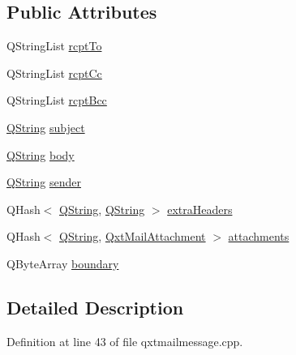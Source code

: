 \subsection*{Public Attributes}
\begin{DoxyCompactItemize}
\item 
Q\-String\-List \hyperlink{struct_qxt_mail_message_private_a2c213268a40ead0fff52429eab1f202f}{rcpt\-To}
\item 
Q\-String\-List \hyperlink{struct_qxt_mail_message_private_a2f20a66e59447730c829c613aad9cdf7}{rcpt\-Cc}
\item 
Q\-String\-List \hyperlink{struct_qxt_mail_message_private_ae0915964b3ff04c0e519d1296676f859}{rcpt\-Bcc}
\item 
\hyperlink{group___u_a_v_objects_plugin_gab9d252f49c333c94a72f97ce3105a32d}{Q\-String} \hyperlink{struct_qxt_mail_message_private_a0f9808e182950b8c18d1d26538fe8658}{subject}
\item 
\hyperlink{group___u_a_v_objects_plugin_gab9d252f49c333c94a72f97ce3105a32d}{Q\-String} \hyperlink{struct_qxt_mail_message_private_aa44931c7c2e5e0873a3c6c5ddd6bf530}{body}
\item 
\hyperlink{group___u_a_v_objects_plugin_gab9d252f49c333c94a72f97ce3105a32d}{Q\-String} \hyperlink{struct_qxt_mail_message_private_ac9edcfbd983f75f565ff1a9b1a4fac32}{sender}
\item 
Q\-Hash$<$ \hyperlink{group___u_a_v_objects_plugin_gab9d252f49c333c94a72f97ce3105a32d}{Q\-String}, \hyperlink{group___u_a_v_objects_plugin_gab9d252f49c333c94a72f97ce3105a32d}{Q\-String} $>$ \hyperlink{struct_qxt_mail_message_private_aea674d61ebec8764d6d8ec62fbdb23f2}{extra\-Headers}
\item 
Q\-Hash$<$ \hyperlink{group___u_a_v_objects_plugin_gab9d252f49c333c94a72f97ce3105a32d}{Q\-String}, \hyperlink{class_qxt_mail_attachment}{Qxt\-Mail\-Attachment} $>$ \hyperlink{struct_qxt_mail_message_private_adb94a04bfb1355c4c0dae30fb18b059f}{attachments}
\item 
Q\-Byte\-Array \hyperlink{struct_qxt_mail_message_private_ac8ae478d215963c6834c1c413abb9b69}{boundary}
\end{DoxyCompactItemize}


\subsection{Detailed Description}


Definition at line 43 of file qxtmailmessage.\-cpp.



